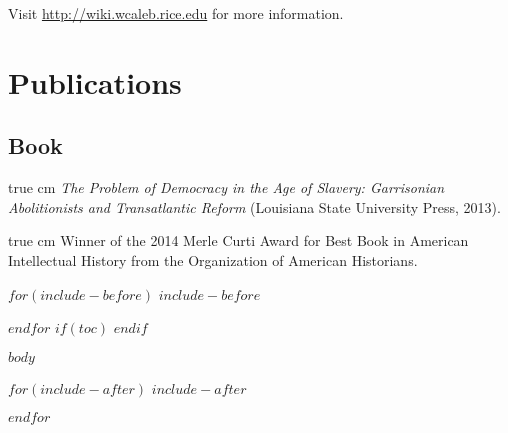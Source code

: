 \documentclass[12pt]{article}
\def\ind{\hangindent=1 true cm\hangafter=1 \noindent}
\begin{document}

\indent Visit \url{http://wiki.wcaleb.rice.edu} for more information.

\section{Publications}

\subsection{Book}

\ind \emph{The Problem of Democracy in the Age of Slavery: Garrisonian Abolitionists and Transatlantic Reform} (Louisiana State University Press, 2013).

\ind Winner of the 2014 Merle Curti Award for Best Book in American Intellectual History from the Organization of American Historians.

$for(include-before)$
$include-before$

$endfor$
$if(toc)$
\tableofcontents
$endif$

$body$

$for(include-after)$
$include-after$

$endfor$
\end{document}
